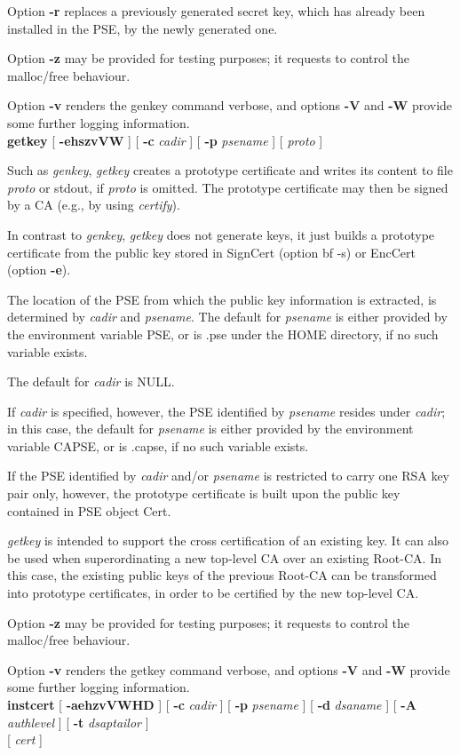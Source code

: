 Option {\bf -r} replaces a previously generated secret key, which has already been installed in 
the PSE, by the newly generated one.

Option {\bf -z} may be provided for testing purposes; it requests to control the malloc/free behaviour.

Option {\bf -v} renders the genkey command verbose, and options {\bf -V} and {\bf -W} 
provide some further logging
information.
\\ [1em]
{\bf getkey} [ {\bf -ehszvVW} ] [ {\bf -c} {\em cadir} ] [ {\bf -p} {\em psename} ] [ {\em proto} ]

Such as {\em genkey}, {\em getkey} creates a prototype certificate and writes its content to file
{\em proto} or stdout, if {\em proto} is omitted. The prototype certificate may then be
signed by a CA (e.g., by using {\em certify}). 

In contrast to {\em genkey}, {\em getkey} does not
generate keys, it just builds a prototype certificate from the public key stored in SignCert
(option {bf -s}) or EncCert (option {\bf -e}). 

The location of the PSE from which the public key information is extracted, is determined by 
{\em cadir} and {\em psename}. The default for {\em 
psename} is either provided by the environment variable PSE, or is .pse under the HOME directory, if no such
variable exists.
 
The default for {\em cadir} is NULL. 

If {\em cadir} is specified,
however, the PSE identified by {\em psename} resides under {\em cadir}; in this case, the default
for {\em psename} is either provided by the environment variable CAPSE, or is .capse, if no such variable
exists.

If the PSE identified by {\em cadir} and/or {\em psename} is restricted to carry 
one RSA key pair only, however, the prototype certificate is built upon the public key contained 
in PSE object Cert.

{\em getkey} is intended to support the cross certification
of an existing key. It can also be used when superordinating a new top-level CA over
an existing Root-CA. In this case, the existing public keys of the previous
Root-CA can be transformed into prototype certificates, in order to be certified by the
new top-level CA.
 
Option {\bf -z} may be provided for testing purposes; it requests to control the malloc/free behaviour.

Option {\bf -v} renders the getkey command verbose, and options {\bf -V} and {\bf -W} provide 
some further logging
information.
\\ [1em] 
{\bf instcert} [ {\bf -aehzvVWHD} ] [ {\bf -c} {\em cadir} ] [ {\bf -p} {\em psename} ] [ {\bf -d} {\em dsaname} ] [ {\bf -A} {\em authlevel} ] [ {\bf -t} {\em dsaptailor} ] \\
\hspace*{2cm} [ {\em cert} ]

